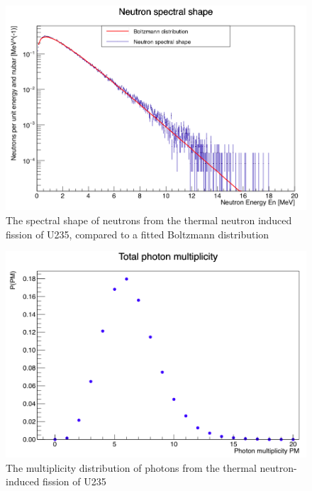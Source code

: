 \documentclass[]{article}
\begin{document}
\begin{figure} [H]
	\centering
	\includegraphics[scale=0.36]{U235_n_spectral_shape.png}
	\caption{The spectral shape of neutrons from the thermal neutron induced fission of U235, compared to a fitted Boltzmann distribution}
	\label{fig:U235_n_spectral_shape}
\end{figure}

\begin{figure} [H]
	\centering
	\includegraphics[scale=0.36]{U235_ph_mult.png}
	\caption{The multiplicity distribution of photons from the thermal neutron-induced fission of U235}
	\label{fig:U235_ph_mult}
\end{figure}
\end{document}
